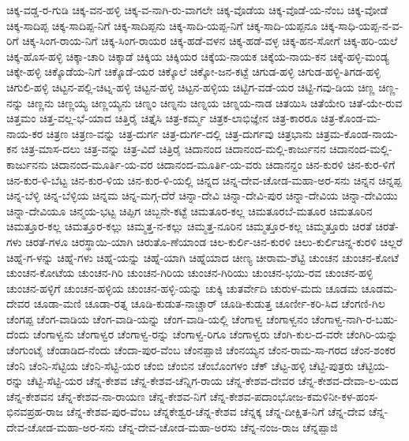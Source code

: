ಚಿಕ್ಕ-ವಡ್ಡ-ರ-ಗುಡಿ
ಚಿಕ್ಕ-ವನ-ಹಳ್ಳಿ
ಚಿಕ್ಕ-ವ-ನಾಗಿ-ರು-ವಾಗಲೇ
ಚಿಕ್ಕ-ವೊಡೆಯ
ಚಿಕ್ಕ-ವೊಡೆ-ಯ-ನೆಂಬ
ಚಿಕ್ಕ-ವೋಡೆ
ಚಿಕ್ಕ-ಸಾದಿಪ್ಪ
ಚಿಕ್ಕ-ಸಾದಿಪ್ಪ-ನಿಗೆ
ಚಿಕ್ಕ-ಸಾದಿಪ್ಪನು
ಚಿಕ್ಕ-ಸಾದಿ-ಯಪ್ಪ-ನಿಗೆ
ಚಿಕ್ಕ-ಸಾದಿ-ಯಪ್ಪನೂ
ಚಿಕ್ಕ-ಸಾಧಿ-ಯಪ್ಪ-ನ-ವ-ರಿಗೆ
ಚಿಕ್ಕ-ಸಿಂಗ-ರಾಯ-ನಿಗೆ
ಚಿಕ್ಕ-ಸಿಂಗ-ರಾಯರ
ಚಿಕ್ಕ-ಹಡೆ-ವಳನ
ಚಿಕ್ಕ-ಹಡೆ-ವಳ್ಳ
ಚಿಕ್ಕ-ಹನ-ಸೋಗೆ
ಚಿಕ್ಕ-ಹರಿ-ಯಲೆ
ಚಿಕ್ಕ-ಹೊಸ-ಹಳ್ಳಿ
ಚಿಕ್ಕಾ-ಚಾರಿ
ಚಿಕ್ಕಾಡೆ
ಚಿಕ್ಕಿಯ
ಚಿಕ್ಕಿಯರ
ಚಿಕ್ಕೆಯ-ನಾಯಕ
ಚಿಕ್ಕೆಯ-ನಾಯ-ಕನ
ಚಿಕ್ಕೆ-ಹಳ್ಳಿ-ಮಂಡ್ಯ
ಚಿಕ್ಕೇ-ಹಳ್ಳಿ
ಚಿಕ್ಕೊಡೆಯ-ನಿಗೆ
ಚಿಕ್ಕೊಡೆ-ಯರ
ಚಿಕ್ಕೊಲೆ
ಚಿಕ್ಕೋ-ಜನ-ಕಟ್ಟೆ
ಚಿಗುಡ-ಹಳ್ಳಿ
ಚಿಗುಡ-ಹಳ್ಳಿ-ತಿಗಡ-ಹಳ್ಳಿ
ಚಿಗುಲಿ-ಹಳ್ಳಿ
ಚಿಟ್ಟನ-ಪಲ್ಲಿ-ಚಿಟ್ನ-ಹಳ್ಳಿ
ಚಿಟ್ಟನ-ಹಳ್ಳಿ
ಚಿಟ್ಟನ-ಹಳ್ಳಿಯ
ಚಿಟ್ಟಿಗ-ವಡೆ-ಯರ
ಚಿಟ್ಟಿ-ಗವು-ಡಿಯ
ಚಿಣ್ಣ
ಚಿಣ್ಣ-ನನ್ನು
ಚಿಣ್ಣನು
ಚಿಣ್ಣಯ್ಯ
ಚಿಣ್ಣಯ್ಯನು
ಚಿಣ್ನಂ
ಚಿಣ್ನನು
ಚಿಣ್ನಯ
ಚಿಣ್ನಯ-ನಾಡ
ಚಿತಯಿಸಿ
ಚಿತೆಯೇರಿ
ಚಿತೆ-ಯೇ-ರುವ
ಚಿತ್ತಮಂ
ಚಿತ್ತ-ವಲ್ಲ-ಭೆ-ಯಾದ
ಚಿತ್ತಿರೈ
ಚಿತ್ತೈಸಿ
ಚಿತ್ರ-ಕರ್ಮ್ಮ
ಚಿತ್ರಕ-ಲಾಭಿಜ್ಞೇನ
ಚಿತ್ರ-ಕಾರರೂ
ಚಿತ್ರ-ಕೊಂಡ-ಮ-ನಾಯ-ಕರ
ಚಿತ್ರಣ
ಚಿತ್ರಣ-ವನ್ನು
ಚಿತ್ರ-ದುರ್ಗ
ಚಿತ್ರ-ದುರ್ಗ-ದಲ್ಲಿ
ಚಿತ್ರ-ದುರ್ಗವು
ಚಿತ್ರಭಾನು
ಚಿತ್ರಮ-ಕೊಂಡ-ನಾಯ-ಕನ
ಚಿತ್ರ-ಮಾಸ-ದಲು
ಚಿತ್ರ-ವನ್ನು
ಚಿತ್ರ-ವಿದೆ
ಚಿತ್ರಿರೈ
ಚಿದಾನಂದ
ಚಿದಾನಂದ-ಮಲ್ಲಿ-ಕಾರ್ಜುನನ
ಚಿದಾನಂದ-ಮಲ್ಲಿ-ಕಾರ್ಜುನನು
ಚಿದಾನಂದ-ಮೂರ್ತಿ-ಯ-ವರ
ಚಿದಾನಂದ-ಮೂರ್ತಿ-ಯ-ವರು
ಚಿದಾನನ್ದಂ
ಚಿನ-ಕುರಳಿ
ಚಿನ-ಕುರ-ಳಿಗೆ
ಚಿನ-ಕುರ-ಳಿ-ಬೆಟ್ಟ
ಚಿನ-ಕುರ-ಳಿಯ
ಚಿನ-ಕುರ-ಳಿ-ಯಲ್ಲಿ
ಚಿನ್ನದ
ಚಿನ್ನ-ದೇವ-ಚೋಡ-ಮಹಾ-ಅರ-ಸನು
ಚಿನ್ನನ
ಚಿನ್ನಪ್ಪ
ಚಿನ್ನ-ಬೆಳ್ಳಿ
ಚಿನ್ನ-ಬೆಳ್ಳಿಯ
ಚಿನ್ನಮ
ಚಿನ್ನ-ಮಗ್ಗ-ದೆರೆ
ಚಿನ್ನಾ-ದೇವಿ
ಚಿನ್ನಾ-ದೇವಿ-ಪುರ
ಚಿನ್ನಾ-ದೇವಿಯ
ಚಿನ್ನಾ-ದೇವಿಯು
ಚಿನ್ನಾ-ದೇವಿಯೂ
ಚಿನ್ಮಯ-ಭಟ್ಟ
ಚಿಪ್ಪಿಗ
ಚಿಬ್ಬನೇ-ಕಟ್ಟೆ
ಚಿಮತೂರ-ಕಲ್ಲ
ಚಿಮತೂರಬೆ-ಮತೂರ
ಚಿಮತೂರಿನ
ಚಿಮತ್ತೂರ-ಕಲ್ಲ
ಚಿಮತ್ತೂರ-ಕಲ್ಲು
ಚಿಮ್ಮತ್ತ-ನ-ಕಲ್ಲು
ಚಿಮ್ಮತ್ತ-ನೂರಿನ
ಚಿಮ್ಮತ್ತೂರ-ಕಲ್ಲ
ಚಿಮ್ಮತ್ತೂರು
ಚಿರತೆ
ಚಿರತೆ-ಗಳು
ಚಿರತೆ-ಗಳೂ
ಚಿರಸ್ಥಾಯಿ-ಯಾಗಿ
ಚಿರುತೊ-ಣೆಯಾಂಡ
ಚಿಲ-ಕುರ್ಲಿ-ಚಿನ-ಕುರಳಿ
ಚಿಲು-ಕುರ್ಲಿಚಿನ್ನ-ಕುರಳಿ
ಚಿಲ್ಲರೆ
ಚಿಹ್ನೆ-ಗ-ಳನ್ನು
ಚಿಹ್ನೆ-ಗಳು
ಚಿಹ್ನೆ-ಯನ್ನು
ಚಿಹ್ನೆ-ಯಾಗಿ
ಚಿಹ್ನೆಯಾದ
ಚೀಣ್ಯ
ಚೀರಾಮ-ಶೆಟ್ಟಿ
ಚುಂಚನ
ಚುಂಚನ-ಕೋಟೆ
ಚುಂಚನ-ಕೋಟೆಯ
ಚುಂಚನ-ಗಿರಿ
ಚುಂಚನ-ಗಿರಿಯ
ಚುಂಚನ-ಗಿರಿಯು
ಚುಂಚನ-ಭಯಿ-ರವ
ಚುಂಚನ-ಹಳ್ಳಿ
ಚುಂಚನ-ಹಳ್ಳಿಗೆ
ಚುಂಚನ-ಹಳ್ಳಿಯ
ಚುಂಚನ-ಹಳ್ಳಿ-ಯನ್ನು
ಚುಕ್ಕಿ
ಚುತರ್ವೇದಿ
ಚುರುಳ-ಮದು
ಚೂಡಮ
ಚೂಡಮ-ದೇವರ
ಚೂಡಾ-ಮಣಿ
ಚೂಡಾ-ರತ್ನ
ಚೂಡಿ-ಕುಡುತ-ನಾಚ್ಚಾರ್
ಚೂಡಿ-ಕುಡುತ್ತ
ಚೂರ್ಣೀ-ಕರಿ-ಸಿದ
ಚೆಂಗಣಿ-ಗಿಲ
ಚೆಂಗಪ್ಪ
ಚೆಂಗ-ವಾಡಿಯ
ಚೆಂಗ-ವಾಡಿ-ಯನ್ನು
ಚೆಂಗ-ವಾಡಿ-ಯಲ್ಲಿ
ಚೆಂಗಾಳ್ವ
ಚೆಂಗಾಳ್ವನಂ
ಚೆಂಗಾಳ್ವ-ನಾಗಿ-ರ-ಬಹು-ದೆಂದು
ಚೆಂಗಾಳ್ವನು
ಚೆಂಗಾಳ್ವರ
ಚೆಂಗಾಳ್ವ-ರನ್ನು
ಚೆಂಗಾಳ್ವ-ರಿಗೂ
ಚೆಂಗಾಳ್ವರು
ಚೆಂಗಿ-ಕುಲ-ದ-ವರೇ
ಚೆಂಗಿರಿ-ಯನ್ನು
ಚೆಂಗುಂಟೈ
ಚೆಂಡಾಡಿದ-ನೆಂದು
ಚೆಂದಾ-ಪುರ-ವೆಂಬ
ಚೆಂನಪ್ಪಾಜಿ
ಚೆಂನಯ್ಯನ
ಚೆಂನ-ರಾಮ-ಸಾ-ಗರದ
ಚೆಂನ-ಶಂಕರ
ಚೆಂನಿ
ಚೆಂನಿ-ಸೆಟ್ಟಿಯ
ಚೆಂನಿ-ಸೆಟ್ಟಿ-ಯರ
ಚೆಂಬಿ
ಚೆಂಬಿನ
ಚೆಂಬೊಂಗಳಂ
ಚೆಕ್
ಚೆಟ್ಟ-ಹಳ್ಳಿ
ಚೆಟ್ಟಿ-ಪುತ್ರರು
ಚೆಟ್ಟಿಯ-ರನ್ನು
ಚೆಟ್ಟಿ-ಸೆಟ್ಟಿ-ಯರ
ಚೆನ್ನ-ಕೇಶವ
ಚೆನ್ನ-ಕೇಶವ-ಚೆನ್ನಿಗ-ರಾಯ
ಚೆನ್ನ-ಕೇಶವ-ದೇವರ
ಚೆನ್ನ-ಕೇಶವ-ದೇವಾ-ಲ-ಯದ
ಚೆನ್ನ-ಕೇಶವನ
ಚೆನ್ನ-ಕೇಶವ-ನಾ-ರಾಯಣ
ಚೆನ್ನ-ಕೇಶವ-ನಿಗೆ
ಚೆನ್ನ-ಕೇಶವ-ಪದಾಂಭೋಜ-ಕಮಳಿನೀ-ಕಳ-ಹಂಸ-ಭಿನವಪ್ರಹ-ರಾಜ
ಚೆನ್ನ-ಕೇಶವ-ಪುರ-ವೆಂಬ
ಚೆನ್ನಕೇಶ್ವರ-ಚೆನ್ನ-ಕೇಶವ
ಚೆನ್ನಕ್ಕ
ಚೆನ್ನ-ದೀಕ್ಷಿತ-ನಿಗೆ
ಚೆನ್ನ-ದೇವ
ಚೆನ್ನ-ದೇವ-ಚೋಡ-ಮಹಾ-ಅರ-ಸನು
ಚೆನ್ನ-ದೇವ-ಚೋಡ-ಮಹಾ-ಅರಸು
ಚೆನ್ನ-ನಂಜ-ರಾಜ
ಚೆನ್ನಪ್ಪಾಜಿ

